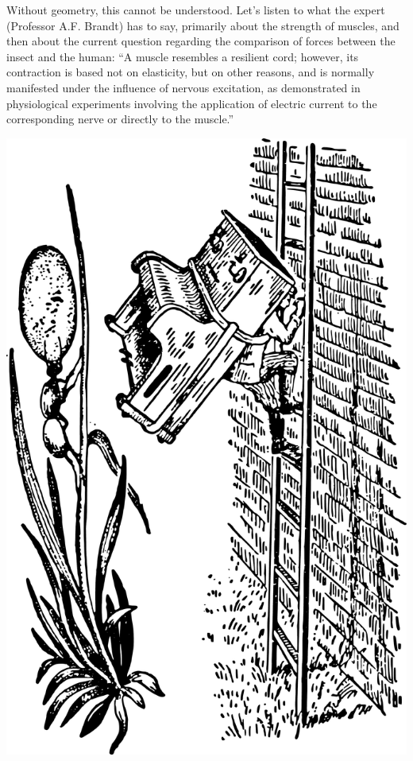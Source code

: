 Without geometry, this cannot be understood. Let's listen to what the expert (Professor A.F. Brandt) has to say, primarily about the strength of muscles, and then about the current question regarding the comparison of forces between the insect and the human: ``A muscle resembles a resilient cord; however, its contraction is based not on elasticity, but on other reasons, and is normally manifested under the influence of nervous excitation, as demonstrated in physiological experiments involving the application of electric current to the corresponding nerve or directly to the muscle.''


\begin{marginfigure}[-1cm]%
\centering
\includegraphics[width=\textwidth]{figures/ch-01/fig-01-24.pdf}
\end{marginfigure}


